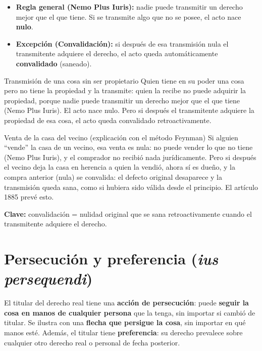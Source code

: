 \documentclass[12pt,oneside]{book}
\begin{document}
\begin{itemize}
    \item \textbf{Regla general (Nemo Plus Iuris):} nadie puede transmitir un derecho mejor que el que tiene. Si se transmite algo que no se posee, el acto nace \textbf{nulo}.
    \item \textbf{Excepci\'on (Convalidaci\'on):} si despu\'es de esa transmisi\'on nula el transmitente adquiere el derecho, el acto queda autom\'aticamente \textbf{convalidado} (saneado).
\end{itemize}

\begin{example}{Transmisi\'on de una cosa sin ser propietario}
Quien tiene en su poder una cosa pero no tiene la propiedad y la transmite: quien la recibe no puede adquirir la propiedad, porque nadie puede transmitir un derecho mejor que el que tiene (Nemo Plus Iuris). El acto nace nulo. Pero si despu\'es el transmitente adquiere la propiedad de esa cosa, el acto queda convalidado retroactivamente.
\end{example}

\begin{example}{Venta de la casa del vecino (explicaci\'on con el m\'etodo Feynman)}
Si alguien ``vende'' la casa de un vecino, esa venta es nula: no puede vender lo que no tiene (Nemo Plus Iuris), y el comprador no recibi\'o nada jur\'idicamente. Pero si despu\'es el vecino deja la casa en herencia a quien la vendi\'o, ahora s\'i es due\~no, y la compra anterior (nula) se convalida: el defecto original desaparece y la transmisi\'on queda sana, como si hubiera sido v\'alida desde el principio. El art\'iculo 1885 prev\'e esto.

\textbf{Clave:} convalidaci\'on = nulidad original que se sana retroactivamente cuando el transmitente adquiere el derecho.
\end{example}

\section{Persecuci\'on y preferencia (\textit{ius persequendi})}

El titular del derecho real tiene una \textbf{acci\'on de persecuci\'on}: puede \textbf{seguir la cosa en manos de cualquier persona} que la tenga, sin importar si cambi\'o de titular. Se ilustra con una \textbf{flecha que persigue la cosa}, sin importar en qu\'e manos est\'e. Adem\'as, el titular tiene \textbf{preferencia}: su derecho prevalece sobre cualquier otro derecho real o personal de fecha posterior.
\end{document}
